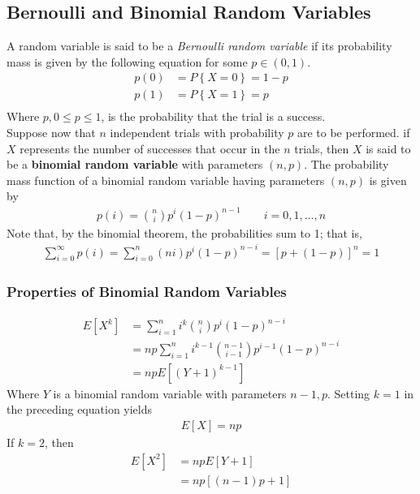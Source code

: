\documentclass[a4paper]{article}
\begin{document}
\subsection{Bernoulli and Binomial Random Variables} %
\label{sub:Bernoulli and Binomal Random Variables}
A random variable is said to be a \emph{Bernoulli random variable} if its probability mass is given by the following equation for some $p \in (0,1)$.
\begin{align}
  p(0) & = P\left\{ X=0 \right\} = 1- p \\
  p(1) & = P\left\{ X=1 \right\} = p \\
\end{align}
Where $p,0\leq p \leq 1$, is the probability that the trial is a success. \\
Suppose now that $n$ independent trials with probability $p$ are to be performed. if $X$ represents the number of successes that occur in the $n$ trials, then $X$ is said to be a {\bf binomial random variable} with parameters $(n,p)$. The probability mass function of a binomial random variable having parameters $(n,p)$ is given by
\begin{align}
  p(i) = { n \choose i} p^i (1-p)^{n-1} \qquad i=0,1, \dots, n
\end{align}
Note that, by the binomial theorem, the probabilities sum to 1; that is,
\begin{align}
  \sum_{i=0}^\infty p(i) = \sum_{i=0}^n (n i)p^i(1-p)^{n-i} = \left[ p+(1-p) \right]^n = 1
\end{align}
\subsubsection{Properties of Binomial Random Variables}
\begin{align}
  E[X^k] & = \sum_{i=1}^n i^k {n \choose i} p^i (1-p)^{n-i} \\
  & = np \sum_{i=1}^n i^{k-1} {n-1 \choose i-1} p^{i-1} (1-p)^{n-i}  \\
  & = np E\left[ \left( Y+1 \right)^{k-1} \right] 
\end{align}
Where $Y$ is a binomial random variable with parameters $n-1,p$. Setting $k=1$ in the preceding equation yields
\begin{align}
  E\left[ X \right] = np
\end{align}
If $k=2$, then
\begin{align}
  E\left[ X^2 \right] & = np E\left[ Y+1 \right] \\
  & = np [ (n-1)p+1]
\end{align}
\end{document}
